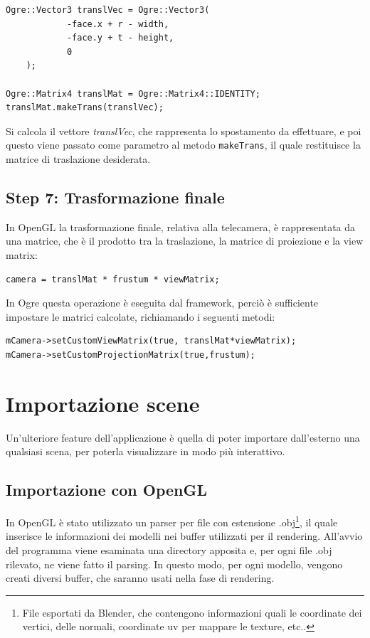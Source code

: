 \begin{lstlisting}
Ogre::Vector3 translVec = Ogre::Vector3(
            -face.x + r - width,
            -face.y + t - height,
            0
    );

Ogre::Matrix4 translMat = Ogre::Matrix4::IDENTITY;
translMat.makeTrans(translVec);
\end{lstlisting}
Si calcola il vettore \textit{translVec}, che rappresenta lo spostamento da effettuare, e poi questo viene passato come parametro al metodo \texttt{makeTrans}, il quale restituisce la matrice di traslazione desiderata.

\subsection*{Step 7: Trasformazione finale}
In OpenGL la trasformazione finale, relativa alla telecamera, è rappresentata da una matrice, che è il prodotto tra la traslazione, la matrice di proiezione e la view matrix:
\vspace{0.5cm}
\begin{lstlisting}
camera = translMat * frustum * viewMatrix;
\end{lstlisting}
In Ogre questa operazione è eseguita dal framework, perciò è sufficiente impostare le matrici calcolate, richiamando i seguenti metodi:
\begin{lstlisting}
mCamera->setCustomViewMatrix(true, translMat*viewMatrix);
mCamera->setCustomProjectionMatrix(true,frustum);
\end{lstlisting}



\section{Importazione scene}
Un'ulteriore feature dell'applicazione è quella di poter importare dall'esterno una qualsiasi scena, per poterla visualizzare in modo più interattivo.


\subsection{Importazione con OpenGL}
In OpenGL è stato utilizzato un parser per file con estensione .obj\footnote{File esportati da Blender, che contengono informazioni quali le coordinate dei vertici, delle normali, coordinate uv per mappare le texture, etc..}, il quale inserisce le informazioni dei modelli nei buffer utilizzati per il rendering. All'avvio del programma viene esaminata una directory apposita e, per ogni file .obj rilevato, ne viene fatto il parsing. In questo modo, per ogni modello, vengono creati diversi buffer, che saranno usati nella fase di rendering.

